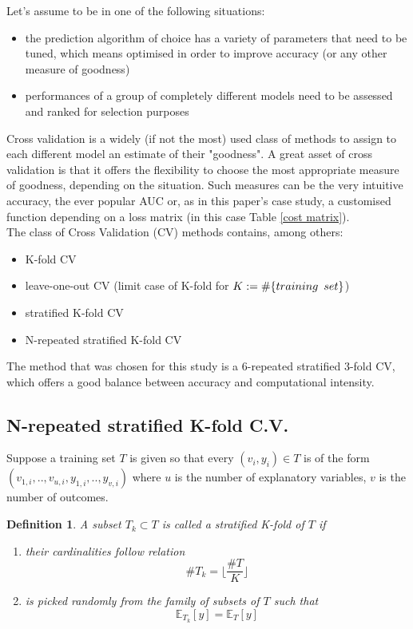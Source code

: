 \documentclass[a4paper,12pt]{article}
\newtheorem{definition}{Definition}[section]
\begin{document}
Let's assume to be in one of the following situations: 
\begin{itemize}
\item the prediction algorithm of choice has a variety of parameters that need to be tuned, which means optimised in order to improve accuracy (or any other measure of goodness)
\item performances of a group of completely different models need to be assessed and ranked for selection purposes
\end{itemize}
Cross validation is a widely (if not the most) used class of methods to assign to each different model an estimate of their "goodness". A great asset of cross validation is that it offers the flexibility to choose the most appropriate measure of goodness, depending on the situation. Such measures can be the very intuitive accuracy, the ever popular AUC or, as in this paper's case study, a customised function depending on a loss matrix (in this case Table \ref{cost matrix}).\\
The class of Cross Validation (CV) methods contains, among others:
\begin{itemize}
\item K-fold CV
\item leave-one-out CV (limit case of K-fold for $K:= \# \{ training \enskip set\}$)
\item stratified K-fold CV
\item N-repeated stratified K-fold CV
\end{itemize}
The method that was chosen for this study is a 6-repeated  stratified 3-fold CV, which offers a good balance between accuracy and computational intensity. 

\subsection{N-repeated stratified K-fold C.V.}

Suppose a training set $T$ is given so that every $(v_{i}, y_{i}) \in T$ is of the form $(v_{1,i}, .., v_{u,i}, y_{1,i}, .., y_{v,i})$ where $u$ is the number of explanatory variables, $v$ is the number of outcomes.

\begin{definition}
A subset $T_{k} \subset T$ is called a stratified K-fold of $T$ if 
\begin{enumerate}
\item their cardinalities follow relation $$ \# T_{k} = \Big\lfloor \frac{\#T}{K} \Big\rfloor $$
\item is picked randomly from the family of subsets of $T$ such that $$ \mathbb{E}_{T_{k}} [y] = \mathbb{E}_{T} [y]$$
\end{enumerate}
\end{definition}
\end{document}
